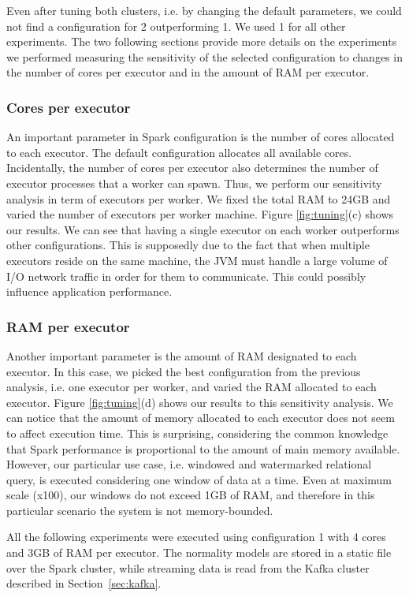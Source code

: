 {Even after tuning both clusters, i.e. by changing the default parameters, we could not find a configuration for \sparkdi{}2 outperforming \sparkdi{}1. We used \sparkdi{}1 for all other experiments. The two following sections provide more details on the experiments we performed measuring the sensitivity of the selected configuration to changes in the number of cores per executor and in the amount of RAM per executor.

\subsubsection{Cores per executor} An important parameter in Spark configuration is the number of cores allocated to each executor. The default configuration allocates all available cores. Incidentally, the number of cores per executor also determines the number of executor processes that a worker can spawn. Thus, we perform our sensitivity analysis in term of executors per worker. We fixed the total RAM to 24GB and varied the number of executors per worker machine. Figure \ref{fig:tuning}(c) shows our results. We can see that having a single executor on each worker outperforms other configurations. This is supposedly due to the fact that when multiple executors reside on the same machine, the JVM must handle a large volume of I/O network traffic in order for them to communicate. This could possibly influence application performance.

\subsubsection{RAM per executor} Another important parameter is the amount of RAM designated to each executor. In this case, we picked the best configuration from the previous analysis, i.e. one executor per worker, and varied the RAM allocated to each executor. Figure \ref{fig:tuning}(d) shows our results to this sensitivity analysis. We can notice that the amount of memory allocated to each executor does not seem to affect execution time. This is surprising, considering the common knowledge that Spark performance is proportional to the amount of main memory available. However, our particular use case, i.e. windowed and watermarked relational query, is executed considering one window of data at a time. Even at maximum scale (x100), our windows do not exceed 1GB of RAM, and therefore in this particular scenario the system is not memory-bounded.

All the following experiments were executed using configuration \sparkdi{}1 with 4 cores and 3GB of RAM per executor. The normality models are stored in a static file over the Spark cluster, while streaming data is read from the Kafka cluster described in Section~\ref{sec:kafka}.

}
